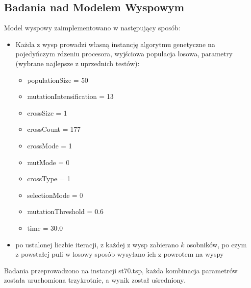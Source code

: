 \documentclass{article}
\begin{document}
\subsection{Badania nad Modelem Wyspowym}
Model wyspowy zaimplementowano w następujący sposób:
\begin{itemize}
	\item Każda z wysp prowadzi własną instancję algorytmu genetyczne na pojedyńczym rdzeniu procesora, wyjściowa populacja losowa, parametry (wybrane najlepsze z uprzednich testów):
	\begin{itemize}
		\item populationSize = 50
		\item mutationIntensification = 13
		\item crossSize = 1
		\item crossCount = 177
		\item crossMode = 1
		\item mutMode = 0
		\item crossType = 1
		\item selectionMode = 0
    	\item mutationThreshold = 0.6
    	\item time = 30.0
	\end{itemize}
	\item po ustalonej liczbie iteracji, z każdej z wysp zabierano $k$ osobników, po czym z powstałej puli w losowy sposób wysyłano ich z powrotem na wyspy
\end{itemize}
Badania przeprowadzono na instancji st70.tsp, każda kombinacja parametrów została uruchomiona trzykrotnie, a wynik został uśredniony.
\end{document}
